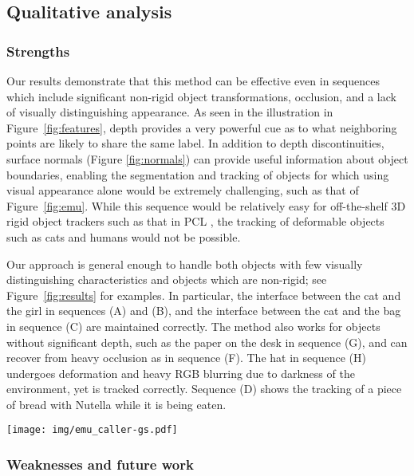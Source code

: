 \documentclass[graybox]{svmult}
\begin{document}
\subsection{Qualitative analysis}

\subsubsection{Strengths}

Our results demonstrate that this method can be effective even in sequences which include significant non-rigid object transformations, occlusion, and a lack of visually distinguishing appearance. As seen in the illustration in Figure~\ref{fig:features}, depth provides a very powerful cue as to what neighboring points are likely to share the same label.  In addition to depth discontinuities, surface normals (Figure \ref{fig:normals}) can provide useful information about object boundaries, enabling the segmentation and tracking of objects for which using visual appearance alone would be extremely challenging, such as that of Figure~\ref{fig:emu}. While this sequence would be relatively easy for off-the-shelf 3D rigid object trackers such as that in PCL \cite{rusu2011a}, the tracking of deformable objects such as cats and humans would not be possible.

Our approach is general enough to handle both objects with few visually distinguishing characteristics and objects which are non-rigid; see Figure~\ref{fig:results} for examples.  In particular, the interface between the cat and the girl in sequences (A) and (B), and the interface between the cat and the bag in sequence (C) are maintained correctly. The method also works for objects without significant depth, such as the paper on the desk in sequence (G), and can recover from heavy occlusion as in sequence (F).  The hat in sequence (H) undergoes deformation and heavy RGB blurring due to darkness of the environment, yet is tracked correctly.  Sequence (D) shows the tracking of a piece of bread with Nutella while it is being eaten.

\begin{figure*}
  \centering
  \texttt{[image: img/emu\_caller-gs.pdf]}
  \caption{Visualization of results in which image appearance alone would lead to a very difficult segmentation problem, but which becomes relatively easy when reasoning about depth as well.}
  \label{fig:emu}
\end{figure*}

\subsubsection{Weaknesses and future work}
\end{document}
